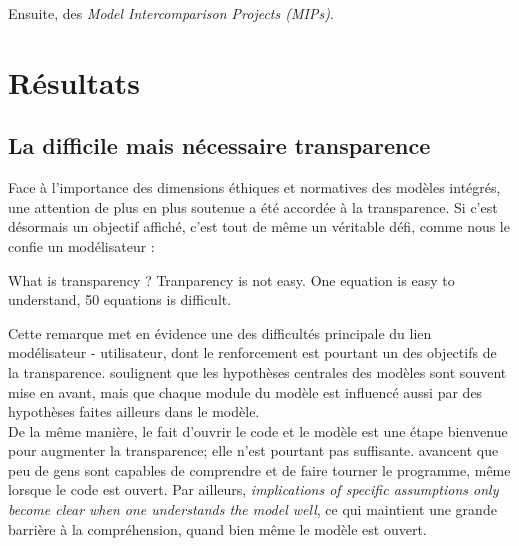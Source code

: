 Ensuite, des \emph{Model Intercomparison Projects (MIPs)}. \\







  






\section{Résultats}

\subsection{La difficile mais nécessaire transparence}

Face à l'importance des dimensions éthiques et normatives des modèles intégrés, une attention de plus en plus soutenue a été accordée à la transparence.  Si c'est désormais un objectif affiché, c'est tout de même un véritable défi, comme nous le confie un modélisateur : 

\begin{displayquote}
    What is transparency ? Tranparency is not easy. One equation is easy to understand, 50 equations is difficult. 
\end{displayquote}
Cette remarque met en évidence une des difficultés principale du lien modélisateur - utilisateur, dont le renforcement est pourtant un des objectifs de la transparence. \cite{keppo_exploring_2021} soulignent que les hypothèses centrales des modèles sont souvent mise en avant, mais que chaque module du modèle est influencé  aussi par des hypothèses faites ailleurs dans le modèle. \\

De la même manière, le fait d'ouvrir le code et le modèle est une étape bienvenue pour augmenter la transparence; elle n'est pourtant pas suffisante. \cite{keppo_exploring_2021} avancent que peu de gens sont capables de comprendre et de faire tourner le programme, même lorsque le code est ouvert. Par ailleurs, \emph{implications of specific assumptions only become clear when one understands the model well}, ce qui maintient une grande barrière à la compréhension, quand bien même le modèle est ouvert. 

